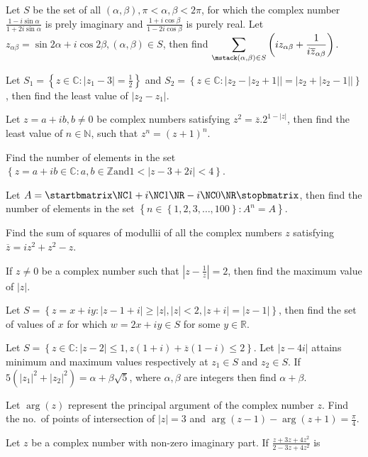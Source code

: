 \item Let $S$ be the set of all $(\alpha, \beta), \pi < \alpha, \beta < 2\pi$, for which the complex number
  $\frac{1 - i\sin\alpha}{1 + 2i\sin\alpha}$ is prely imaginary and $\frac{1 + i\cos\beta}{1 - 2i\cos\beta}$
  is purely real. Let $z_{\alpha\beta} = \sin2\alpha + i\cos2\beta, (\alpha, \beta)\in S$, then find
  $\displaystyle\sum_{\mstack (\alpha, \beta)\in S}\left(iz_{\alpha\beta} +
  \frac{1}{i\overline{z}_{\alpha\beta}}\right)$.
\item Let $S_1 = \left\{z\in\mathbb{C}: |z_1 - 3| = \frac{1}{2}\right\}$ and $S_2 = \left\{z\in\mathbb{C}:
  \bigl|z_2 - |z_2 + 1|\bigr| = \bigl|z_2 + |z_2 - 1|\bigr|\right\}$, then find the least value of $|z_2 -
  z_1|$.
\item Let $z = a + ib, b\neq 0$ be complex numbers satisfying $z^2 = \overline{z}.2^{1 - |z|}$, then find
  the least value of $n\in\mathbb{N}$, such that $z^n = (z + 1)^n$.
\item Find the number of elements in the set $\left\{z = a + ib\in\mathbb{C}: a, b\in\mathbb{Z} \mathrm{ and
} 1 < |z - 3 + 2i| < 4\right\}$.
\item Let $A = \startbmatrix\NC1 + i\NC 1\NR -i\NC 0\NR\stopbmatrix$, then find the number of elements in
  the set $\left\{n\in \left\{1, 2, 3, \ldots, 100\right\}: A^n= A\right\}$.
\item Find the sum of squares of modullii of all the complex numbers $z$ satisfying $\overline{z} = iz^2 +
  z^2 - z$.
\item If $z\neq 0$ be a complex number such that $\left|z - \frac{1}{z}\right| = 2$, then find the maximum
  value of $|z|$.
\item Let $S = \left\{z = x + iy: |z - 1 + i|\geq |z|, |z| < 2, |z + i| = |z - 1|\right\}$, then find the
  set of values of $x$ for which $w = 2x + iy\in S$ for some $y\in\mathbb{R}$.
\item Let $S = \left\{z\in\mathbb{C}: |z - 2|\leq 1, z(1 + i) + \overline{z}(1 - i)\leq 2\right\}$. Let $|z
  - 4i|$ attains minimum and maximum values respectively at $z_1\in S$ and $z_2\in S$. If $5(|z_1|^2 +
  |z_2|^2) = \alpha + \beta\sqrt{5}$, where $\alpha, \beta$ are integers then find $\alpha + \beta$.
\item Let $\arg(z)$ represent the principal argument of the complex number $z$. Find the no.\ of points of
  intersection of $|z| = 3$ and $\arg(z - 1) - \arg(z + 1) = \frac{\pi}{4}$.
\item Let $z$ be a complex number with non-zero imaginary part. If $\frac{z + 3z + 4z^2}{2 - 3z + 4z^2}$ is
